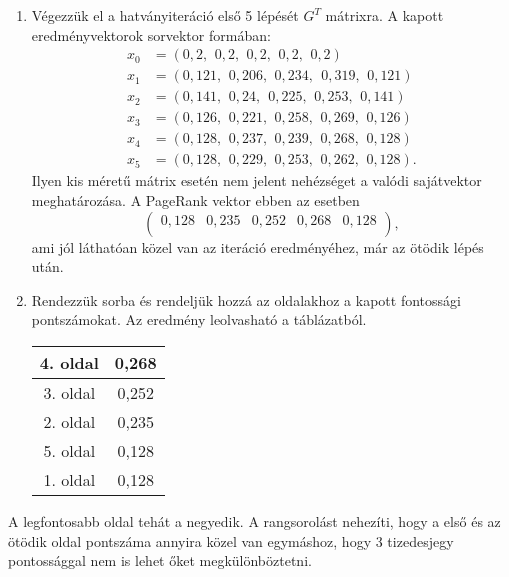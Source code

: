 \documentclass[12pt,a4paper]{article}
\begin{document}
\begin{enumerate}[label=(\Roman*)]
\item Végezzük el a hatványiteráció első 5 lépését $G^T$ mátrixra. A kapott eredményvektorok sorvektor formában:
\[
\begin{split}
x_0 & = ( 0,\!2, \ \,0,\!2, \! \ \, 0,\!2 ,\ \, 0,\!2 ,\ \, 0,\!2   ) \\
x_1 & = (  0,\!121 ,\ \, 0,\!206 ,\ \, 0,\!234 ,\ \ 0,\!319 ,\ \, 0,\!121 )\\   
x_2 & = (  0,\!141 ,\ \, 0,\!24,\ \ 0,\!225 ,\ \, 0,\!253 ,\ \, 0,\!141 )\\   
x_3 & = (  0,\!126 ,\ \, 0,\!221 ,\ \, 0,\!258 ,\ \, 0,\!269 ,\ \, 0,\!126) \\  
x_4 & = (  0,\!128 ,\ \, 0,\!237 ,\ \, 0,\!239 ,\ \, 0,\!268 ,\ \, 0,\!128 )\\  
x_5 & = (  0,\!128 ,\ \, 0,\!229 ,\ \, 0,\!253 ,\ \, 0,\!262 ,\ \, 0,\!128 ). 
\end{split}
\]
Ilyen kis méretű mátrix esetén nem jelent nehézséget a valódi sajátvektor 
meghatározása. A PageRank vektor ebben az esetben
\[\begin{pmatrix} 0,128 & 0,235 & 0,252 & 0,268 & 0,128 \\ \end{pmatrix},\]
ami jól láthatóan közel van az iteráció eredményéhez, már az ötödik lépés után.

\item Rendezzük sorba és rendeljük hozzá az oldalakhoz a kapott fontossági pontszámokat. Az eredmény leolvasható a táblázatból.
\begin{center}
	\begin{tabular}{c | c}
		4. oldal & 0,268 \\
		\hline
		3. oldal & 0,252 \\
		2. oldal & 0,235 \\
		5. oldal & 0,128 \\
		1. oldal & 0,128 \\
	\end{tabular}
\end{center}
\end{enumerate}
A legfontosabb oldal tehát a negyedik. A rangsorolást nehezíti, hogy a első és az ötödik oldal pontszáma annyira közel van egymáshoz, hogy 3 tizedesjegy pontossággal nem is lehet őket megkülönböztetni.



\end{document}
